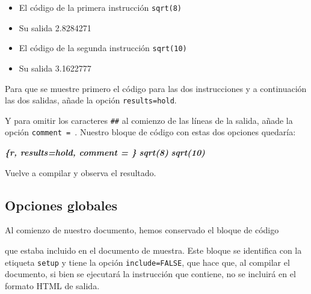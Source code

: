 \documentclass[
  title=normal,
  notoc,
  bib=normal]{mnye}
\newenvironment{Shaded}{\begin{snugshade}}{\end{snugshade}}
\newcommand{\InformationTok}[1]{\textcolor[rgb]{0.56,0.35,0.01}{\textbf{\textit{#1}}}}
\providecommand{\tightlist}{%
  \setlength{\itemsep}{0pt}\setlength{\parskip}{0pt}}
\begin{document}
\begin{itemize}
\tightlist
\item
  El código de la primera instrucción \texttt{sqrt(8)}
\item
  Su salida 2.8284271
\item
  El código de la segunda instrucción \texttt{sqrt(10)}
\item
  Su salida 3.1622777
\end{itemize}

Para que se muestre primero el código para las dos instrucciones y a continuación las dos salidas, añade la opción \texttt{results=\textquotesingle{}hold\textquotesingle{}}.

Y para omitir los caracteres \texttt{\#\#} al comienzo de las líneas de la salida, añade la opción \texttt{comment\ =\ \textquotesingle{}\textquotesingle{}}. Nuestro bloque de código con estas dos opciones quedaría:

\begin{Shaded}
\begin{Highlighting}[]
\InformationTok{\textasciigrave{}\textasciigrave{}\textasciigrave{}\{r, results=\textquotesingle{}hold\textquotesingle{}, comment = \textquotesingle{}\textquotesingle{}\}}
\InformationTok{sqrt(8)}
\InformationTok{sqrt(10)}
\InformationTok{\textasciigrave{}\textasciigrave{}\textasciigrave{}}
\end{Highlighting}
\end{Shaded}

Vuelve a compilar y observa el resultado.

\hypertarget{global-options}{%
\subsection{Opciones globales}\label{global-options}}

Al comienzo de nuestro documento, hemos conservado el bloque de código

\begin{Shaded}
\end{Shaded}

que estaba incluido en el documento de muestra. Este bloque se identifica con la etiqueta \texttt{setup} y tiene la opción \texttt{include=FALSE}, que hace que, al compilar el documento, si bien se ejecutará la instrucción que contiene, no se incluirá en el formato HTML de salida.
\end{document}

